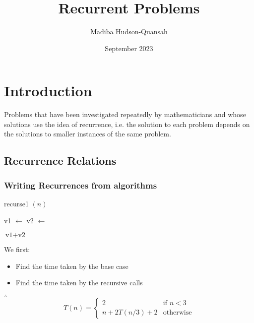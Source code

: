 \documentclass[12pt letter]{report}
\title{\Huge{Recurrent Problems}}
\author{\huge{Madiba Hudson-Quansah}}
\date{September 2023}
\begin{document}
\maketitle
\newpage
{}
\tableofcontents
\pagebreak

\chapter{Introduction}

Problems that have been investigated repeatedly by mathematicians and whose solutions use the idea of recurrence, i.e.
the solution to each problem depends on the solutions to smaller instances of the same problem.

\section{Recurrence Relations}

\subsection{Writing Recurrences from algorithms}

\begin{algorithm}[H]
  \caption{recurse1 $ \left( n \right) $}
  \begin{algorithmic}[1]
    \State {}
    \EndIf
    \State {}
    \EndFor

    \State v1 $ \gets $ 
    \State v2 $ \gets $ 

    \State \Return $\text{v1} + \text{v2}$
  \end{algorithmic}
\end{algorithm}

We first:
\begin{itemize}
  \item Find the time taken by the base case
  \item Find the time taken by the recursive calls
\end{itemize}

$\therefore$
\[
  T \left( n \right)  = \begin{cases}
    2                                 & \text{if } n < 3 \\
    n + 2 T \left( n / 3 \right)  + 2 & \text{otherwise}
  \end{cases}
\]
\end{document}
